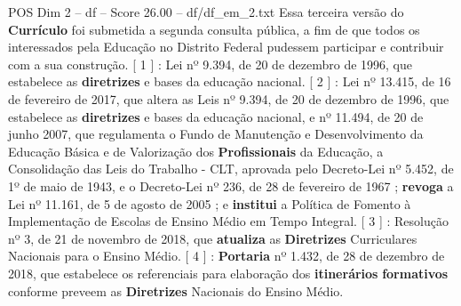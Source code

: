 \begin{textsample}{POS Dim 2 – df – Score 26.00 – df/df\_em\_2.txt}
Essa terceira versão do \textbf{Currículo} foi submetida a segunda consulta pública, a fim de que todos os interessados pela Educação no Distrito Federal pudessem participar e contribuir com a sua construção. [ 1 ] : Lei nº 9.394, de 20 de dezembro de 1996, que estabelece as \textbf{diretrizes} e bases da educação nacional. [ 2 ] : Lei nº 13.415, de 16 de fevereiro de 2017, que altera as Leis nº 9.394, de 20 de dezembro de 1996, que estabelece as \textbf{diretrizes} e bases da educação nacional, e nº 11.494, de 20 de junho 2007, que regulamenta o Fundo de Manutenção e Desenvolvimento da Educação Básica e de Valorização dos \textbf{Profissionais} da Educação, a Consolidação das Leis do Trabalho - CLT, aprovada pelo Decreto-Lei nº 5.452, de 1º de maio de 1943, e o Decreto-Lei nº 236, de 28 de fevereiro de 1967 ; \textbf{revoga} a Lei nº 11.161, de 5 de agosto de 2005 ; e \textbf{institui} a Política de Fomento à Implementação de Escolas de Ensino Médio em Tempo Integral. [ 3 ] : Resolução nº 3, de 21 de novembro de 2018, que \textbf{atualiza} as \textbf{Diretrizes} Curriculares Nacionais para o Ensino Médio. [ 4 ] : \textbf{Portaria} nº 1.432, de 28 de dezembro de 2018, que estabelece os referenciais para elaboração dos \textbf{itinerários} \textbf{formativos} conforme preveem as \textbf{Diretrizes} Nacionais do Ensino Médio.

\end{textsample}
